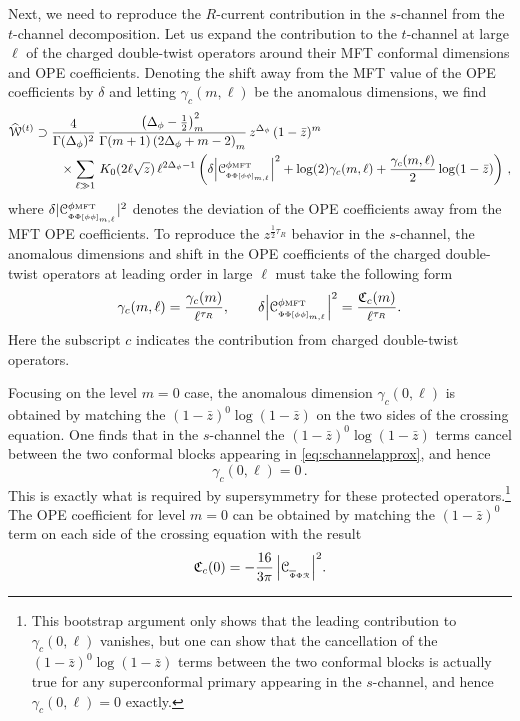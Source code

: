 \documentclass[11pt]{article}
\newcommand{\zb}{\bar{z}}
\newcommand{\Phib}{\overline{\Phi}}
\newcommand{\cope}[1]{\mathcal{C}_{_{#1}}}
\newcommand{\mft}{\text{\tiny MFT}}
\begin{document}
Next, we need to reproduce the $R$-current contribution in the $s$-channel from the $t$-channel decomposition. Let us  expand the contribution to the $t$-channel at large $\ell$ of the charged double-twist operators around their MFT conformal dimensions and OPE coefficients. Denoting the shift away from the MFT value of the OPE coefficients by $\delta$ and letting $\gamma_c(m,\ell)$ be the anomalous dimensions, we find 
%
\begin{equation}\label{eq:MFTcorrection}
\begin{split}
\widehat{\mathcal{W}}^{(t)} 
&\supset 
  \frac{4}{\Gamma(\Delta_{\phi})^{2}}\,
  \frac{\left(\Delta_{\phi}-\frac{1}{2}\right)_{m}^{2}}{\Gamma(m+1) \left(2\Delta_{\phi}+m-2\right)_{m}}\, z^{\Delta_{\phi}} \, (1-\zb)^{m}\\	
  &\qquad 
    \times
      \sum_{\ell \gg 1}\, 
       K_{0}(2\ell\sqrt{z}) \, \ell^{2\Delta_{\phi}-1}
        \left(\delta\abs{\cope{\Phi\Phi[\phi\phi]_{m,\ell}}^{\phi\mft}}^{2}+\log(2)\gamma_{c}(m,\ell)+\frac{\gamma_{c}(m,\ell)}{2}\log(1-\zb)\right)\,,
\end{split}
\end{equation}
%
where $\delta|\cope{\Phi\Phi[\phi\phi]_{m,\ell}}^{\phi\mft}|^{2}$ denotes the deviation of the OPE coefficients away from the MFT OPE coefficients.
To reproduce the $z^{\frac{1}{2} \tau_R}$ behavior in the $s$-channel, the anomalous dimensions and shift in the OPE coefficients of the charged double-twist operators at leading order in large $\ell$ must take the following form
%
\begin{equation}\label{eq:anomOPEcharged}
\gamma_{c}(m,\ell) = \frac{\gamma_c(m)}{\ell^{\tau_R}}, \qquad 
\delta\abs{\cope{\Phi\Phi[\phi\phi]_{m,\ell}}^{\phi\mft}}^{2} = \frac{\mathfrak{C}_c(m)}{\ell^{\tau_R}}.
\end{equation}
%
Here the subscript $c$ indicates the contribution from charged double-twist operators.

Focusing on the level $m=0$ case, the anomalous dimension $\gamma_{c}(0,\ell)$ is obtained by matching the $(1-\zb)^{0}\log(1-\zb)$ on the two sides of the crossing equation. One finds that in the $s$-channel the $(1-\zb)^{0}\log(1-\zb)$ terms cancel between the two conformal blocks appearing in \eqref{eq:schannelapprox}, and hence 
%
\begin{equation}
\gamma_{c}(0,\ell) = 0 \,.
\end{equation}  
%
This is exactly what is required by supersymmetry for these protected operators.\footnote{This bootstrap argument only shows that the leading contribution to $\gamma_{c}(0,\ell)$ vanishes, but one can show that the cancellation of the $(1-\zb)^{0}\log(1-\zb)$ terms between the two conformal blocks is actually true for any superconformal primary appearing in the $s$-channel, and hence $\gamma_{c}(0,\ell)=0$ exactly.}  The OPE coefficient for level $m=0$ can be 
obtained by matching the $(1-\zb)^{0}$ term on each side of the crossing equation with the result
%
\begin{equation}\label{eq:chargedOPEcoeffs_m=0}
\mathfrak{C}_{c}(0) = {-}\frac{16}{3\pi} \, \abs{\cope{\Phib\Phi\mathcal{R}}}^2.
\end{equation}
%
\end{document}
